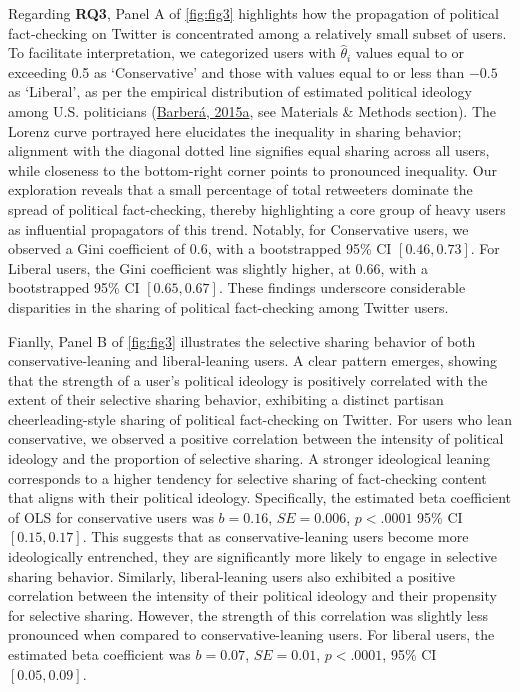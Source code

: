 \documentclass[
  12pt,
]{article}
\begin{document}
Regarding \textbf{RQ3}, Panel A of \autoref{fig:fig3} highlights how the
propagation of political fact-checking on Twitter is concentrated among
a relatively small subset of users. To facilitate interpretation, we
categorized users with \(\hat{\theta}_i\) values equal to or exceeding
0.5 as `Conservative' and those with values equal to or less than
\(-0.5\) as `Liberal', as per the empirical distribution of estimated
political ideology among U.S. politicians
(\protect\hyperlink{ref-barbera2015birds}{Barberá, 2015a}, see Materials
\& Methods section). The Lorenz curve portrayed here elucidates the
inequality in sharing behavior; alignment with the diagonal dotted line
signifies equal sharing across all users, while closeness to the
bottom-right corner points to pronounced inequality. Our exploration
reveals that a small percentage of total retweeters dominate the spread
of political fact-checking, thereby highlighting a core group of heavy
users as influential propagators of this trend. Notably, for
Conservative users, we observed a Gini coefficient of 0.6, with a
bootstrapped 95\% CI \([0.46, 0.73]\). For Liberal users, the Gini
coefficient was slightly higher, at 0.66, with a bootstrapped 95\% CI
\([0.65, 0.67]\). These findings underscore considerable disparities in
the sharing of political fact-checking among Twitter users.

Fianlly, Panel B of \autoref{fig:fig3} illustrates the selective sharing
behavior of both conservative-leaning and liberal-leaning users. A clear
pattern emerges, showing that the strength of a user's political
ideology is positively correlated with the extent of their selective
sharing behavior, exhibiting a distinct partisan cheerleading-style
sharing of political fact-checking on Twitter. For users who lean
conservative, we observed a positive correlation between the intensity
of political ideology and the proportion of selective sharing. A
stronger ideological leaning corresponds to a higher tendency for
selective sharing of fact-checking content that aligns with their
political ideology. Specifically, the estimated beta coefficient of OLS
for conservative users was \(b = 0.16\), \(SE = 0.006\), \(p < .0001\)
95\% CI \([0.15, 0.17]\). This suggests that as conservative-leaning
users become more ideologically entrenched, they are significantly more
likely to engage in selective sharing behavior. Similarly,
liberal-leaning users also exhibited a positive correlation between the
intensity of their political ideology and their propensity for selective
sharing. However, the strength of this correlation was slightly less
pronounced when compared to conservative-leaning users. For liberal
users, the estimated beta coefficient was \(b = 0.07\), \(SE = 0.01\),
\(p < .0001\), 95\% CI \([0.05, 0.09]\).
\end{document}

